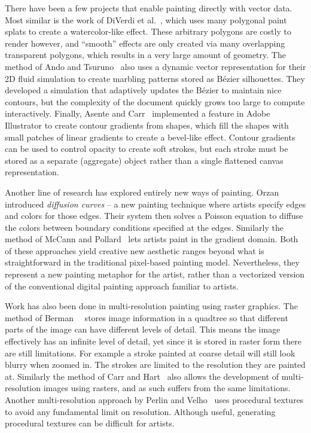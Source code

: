 \documentclass[review,draft]{acmsiggraph}
\begin{document}
There have been a few projects that enable painting directly with vector data.  Most similar is the work of DiVerdi et al.~, which uses many polygonal paint splats to create a watercolor-like effect.  These arbitrary polygons are costly to render however, and ``smooth'' effects are only created via many overlapping transparent polygons, which results in a very large amount of geometry. The method of Ando and Tsuruno~ also uses a dynamic vector representation for their 2D fluid simulation to create marbling patterns stored as B\'{e}zier silhouettes.  They developed a simulation that adaptively updates the B\'{e}zier to maintain nice contours, but the complexity of the document quickly grows too large to compute interactively.  Finally, Asente and Carr~ implemented a feature in Adobe Illustrator to create contour gradients from shapes, which fill the shapes with small patches of linear gradients to create a bevel-like effect.  Contour gradients can be used to control opacity to create soft strokes, but each stroke must be stored as a separate (aggregate) object rather than a single flattened canvas representation.

Another line of research has explored entirely new ways of painting.
Orzan~\etal~
introduced \emph{diffusion curves} --
a new painting technique where artists specify edges and colors for those edges. Their system
then solves a Poisson equation to diffuse the colors between boundary conditions specified at the edges.
Similarly the method of McCann and Pollard~
lets artists paint in the gradient domain. Both of these approaches yield creative new aesthetic ranges 
beyond what is straightforward in the traditional pixel-based painting model. Nevertheless,
they represent a new painting metaphor for the artist, rather than a vectorized version of the conventional
digital painting approach familiar to artists.

Work has also been done in multi-resolution painting using raster graphics. The method of Berman~\etal~
stores image information in a quadtree so that different parts of the image can have different levels of detail.
This means the image effectively has an infinite level of detail, yet since it is stored in raster form
there are still limitations. For example a stroke painted at coarse detail will still look blurry when
zoomed in. The strokes are limited to the resolution they are painted at. Similarly the method of Carr and Hart~
also allows the development of multi-resolution images using rasters, and as such suffers from the
same limitations. Another multi-resolution approach by Perlin and Velho~ uses
procedural textures to avoid any fundamental limit on resolution. Although useful,
generating procedural textures can be difficult for artists.
\end{document}
